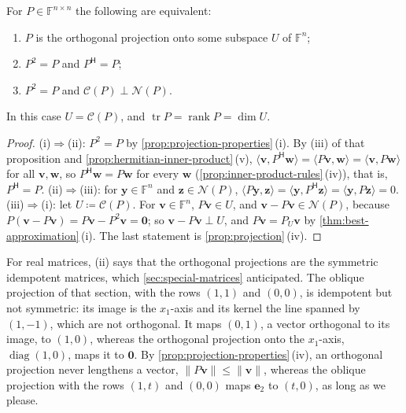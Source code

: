 \begin{theorem}
\label{thm:projection-characterisation}
For $P\in\mathbb F^{n\times n}$ the following are equivalent:
\begin{enumerate}
\item $P$ is the orthogonal projection onto some subspace $U$ of $\mathbb F^n$;
\item $P^2=P$ and $P^{\mathsf H}=P$;
\item $P^2=P$ and $\mathcal C(P)\perp\mathcal N(P)$.
\end{enumerate}
In this case $U=\mathcal C(P)$, and $\operatorname{tr}P=\operatorname{rank}P=\dim U$.
\end{theorem}

\begin{proof}
(i)$\Rightarrow$(ii): $P^2=P$ by \cref{prop:projection-properties}\,(i). By (iii) of that proposition and \cref{prop:hermitian-inner-product}\,(v), $\langle\mathbf v,P^{\mathsf H}\mathbf w\rangle=\langle P\mathbf v,\mathbf w\rangle=\langle\mathbf v,P\mathbf w\rangle$ for all $\mathbf v,\mathbf w$, so $P^{\mathsf H}\mathbf w=P\mathbf w$ for every $\mathbf w$ (\cref{prop:inner-product-rules}\,(iv)), that is, $P^{\mathsf H}=P$. (ii)$\Rightarrow$(iii): for $\mathbf y\in\mathbb F^n$ and $\mathbf z\in\mathcal N(P)$, $\langle P\mathbf y,\mathbf z\rangle=\langle\mathbf y,P^{\mathsf H}\mathbf z\rangle=\langle\mathbf y,P\mathbf z\rangle=0$. (iii)$\Rightarrow$(i): let $U\coloneqq\mathcal C(P)$. For $\mathbf v\in\mathbb F^n$, $P\mathbf v\in U$, and $\mathbf v-P\mathbf v\in\mathcal N(P)$, because $P(\mathbf v-P\mathbf v)=P\mathbf v-P^2\mathbf v=\mathbf 0$; so $\mathbf v-P\mathbf v\perp U$, and $P\mathbf v=P_U\mathbf v$ by \cref{thm:best-approximation}\,(i). The last statement is \cref{prop:projection}\,(iv).
\end{proof}

For real matrices, (ii) says that the orthogonal projections are the symmetric idempotent matrices, which \cref{sec:special-matrices} anticipated. The oblique projection of that section, with the rows $(1,1)$ and $(0,0)$, is idempotent but not symmetric: its image is the $x_1$-axis and its kernel the line spanned by $(1,-1)$, which are not orthogonal. It maps $(0,1)$, a vector orthogonal to its image, to $(1,0)$, whereas the orthogonal projection onto the $x_1$-axis, $\operatorname{diag}(1,0)$, maps it to $\mathbf 0$. By \cref{prop:projection-properties}\,(iv), an orthogonal projection never lengthens a vector, $\|P\mathbf v\|\le\|\mathbf v\|$, whereas the oblique projection with the rows $(1,t)$ and $(0,0)$ maps $\mathbf e_2$ to $(t,0)$, as long as we please.

